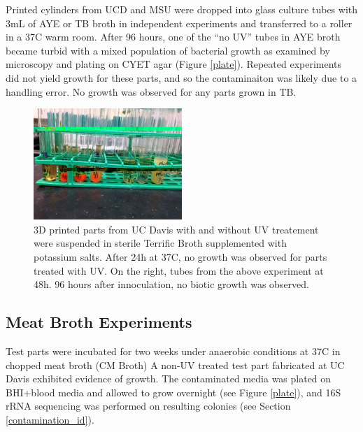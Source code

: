 \documentclass[fleqn,10pt]{wlpeerj}
\begin{document}
Printed cylinders from UCD and MSU were dropped into glass culture tubes with 3mL of AYE or TB broth in independent experiments and transferred to a roller in a 37C warm room. After 96 hours, one of the ``no UV'' tubes in AYE broth became turbid with a mixed population of bacterial growth as examined by microscopy and plating on CYET agar (Figure \ref{plate}). Repeated experiments did not yield growth for these parts, and so the contaminaiton was likely due to a handling error. No growth was observed for any parts grown in TB.

\begin{figure}[!h]
  \centering
    \includegraphics[width=0.5\textwidth]{terrific_broth}
    \caption{3D printed parts from UC Davis with and without UV treatement were suspended in sterile Terrific Broth supplemented with potassium salts. After 24h at 37C, no growth was observed for parts treated with UV. On the right, tubes from the above experiment at 48h. 96 hours after innoculation, no biotic growth was observed.}
\end{figure}

\subsection{Meat Broth Experiments}\label{meat_broth}

Test parts were incubated for two weeks under anaerobic conditions at 37C in chopped meat broth (CM Broth) \cite{seaweed_human_gut} A non-UV treated test part fabricated at UC Davis exhibited evidence of growth. The contaminated media was plated on BHI+blood media and allowed to grow overnight (see Figure \ref{plate}), and 16S rRNA sequencing was performed on resulting colonies (see Section \ref{contamination_id}). 
\end{document}
